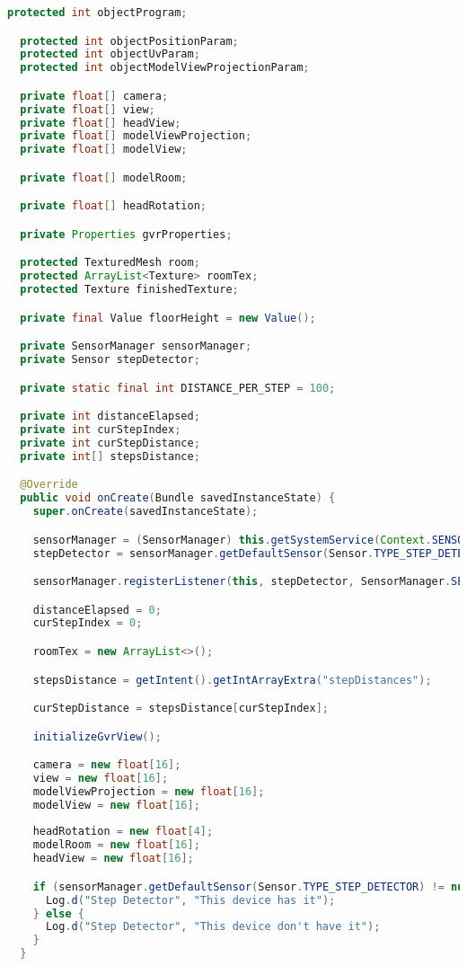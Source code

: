 \begin{lstlisting}[language=Java,caption=VrActivity.java]
  protected int objectProgram;

  protected int objectPositionParam;
  protected int objectUvParam;
  protected int objectModelViewProjectionParam;

  private float[] camera;
  private float[] view;
  private float[] headView;
  private float[] modelViewProjection;
  private float[] modelView;

  private float[] modelRoom;

  private float[] headRotation;

  private Properties gvrProperties;

  protected TexturedMesh room;
  protected ArrayList<Texture> roomTex;
  protected Texture finishedTexture;

  private final Value floorHeight = new Value();

  private SensorManager sensorManager;
  private Sensor stepDetector;

  private static final int DISTANCE_PER_STEP = 100;

  private int distanceElapsed;
  private int curStepIndex;
  private int curStepDistance;
  private int[] stepsDistance;

  @Override
  public void onCreate(Bundle savedInstanceState) {
    super.onCreate(savedInstanceState);

    sensorManager = (SensorManager) this.getSystemService(Context.SENSOR_SERVICE);
    stepDetector = sensorManager.getDefaultSensor(Sensor.TYPE_STEP_DETECTOR);

    sensorManager.registerListener(this, stepDetector, SensorManager.SENSOR_DELAY_FASTEST);

    distanceElapsed = 0;
    curStepIndex = 0;

    roomTex = new ArrayList<>();

    stepsDistance = getIntent().getIntArrayExtra("stepDistances");

    curStepDistance = stepsDistance[curStepIndex];

    initializeGvrView();

    camera = new float[16];
    view = new float[16];
    modelViewProjection = new float[16];
    modelView = new float[16];
    
    headRotation = new float[4];
    modelRoom = new float[16];
    headView = new float[16];

    if (sensorManager.getDefaultSensor(Sensor.TYPE_STEP_DETECTOR) != null) {
      Log.d("Step Detector", "This device has it");
    } else {
      Log.d("Step Detector", "This device don't have it");
    }
  }


\end{lstlisting}
